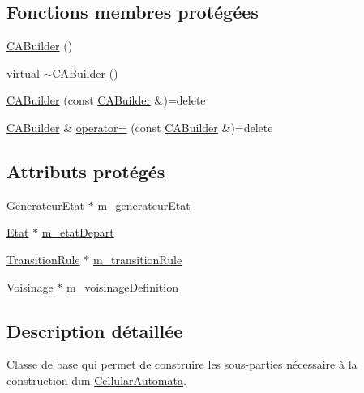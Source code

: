 \subsection*{Fonctions membres protégées}
\begin{DoxyCompactItemize}
\item 
\mbox{\hyperlink{class_c_a_builder_a83d89eba527bee907d22d657fab5fbf6}{C\+A\+Builder}} ()
\item 
virtual \mbox{\hyperlink{class_c_a_builder_a9f917ce136fc4a5d84a89734039f720d}{$\sim$\+C\+A\+Builder}} ()
\item 
\mbox{\hyperlink{class_c_a_builder_af725c741fdb6c5304763638c72d1aa52}{C\+A\+Builder}} (const \mbox{\hyperlink{class_c_a_builder}{C\+A\+Builder}} \&)=delete
\item 
\mbox{\hyperlink{class_c_a_builder}{C\+A\+Builder}} \& \mbox{\hyperlink{class_c_a_builder_a96af5f657cd2b3bebb17c9ce730583a0}{operator=}} (const \mbox{\hyperlink{class_c_a_builder}{C\+A\+Builder}} \&)=delete
\end{DoxyCompactItemize}
\subsection*{Attributs protégés}
\begin{DoxyCompactItemize}
\item 
\mbox{\hyperlink{class_generateur_etat}{Generateur\+Etat}} $\ast$ \mbox{\hyperlink{class_c_a_builder_a8c08002f200d7369f116e2ea1c468ab4}{m\+\_\+generateur\+Etat}}
\item 
\mbox{\hyperlink{class_etat}{Etat}} $\ast$ \mbox{\hyperlink{class_c_a_builder_ac84f3fee62f37c9ae4b78eeff17e6af4}{m\+\_\+etat\+Depart}}
\item 
\mbox{\hyperlink{class_transition_rule}{Transition\+Rule}} $\ast$ \mbox{\hyperlink{class_c_a_builder_af9b64de3a92d0eeef2e7bad30f945ee8}{m\+\_\+transition\+Rule}}
\item 
\mbox{\hyperlink{class_voisinage}{Voisinage}} $\ast$ \mbox{\hyperlink{class_c_a_builder_a8d030d6b0bf0ca88d2bd5b88e1f1b041}{m\+\_\+voisinage\+Definition}}
\end{DoxyCompactItemize}


\subsection{Description détaillée}
Classe de base qui permet de construire les sous-\/parties nécessaire à la construction d\textquotesingle{}un \mbox{\hyperlink{class_cellular_automata}{Cellular\+Automata}}. 

